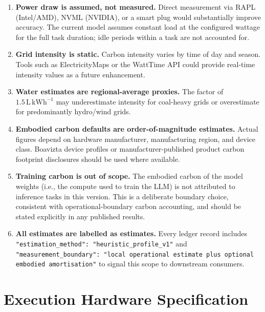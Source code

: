\documentclass[12pt]{article}
\begin{document}
\begin{enumerate}
  \item \textbf{Power draw is assumed, not measured.} Direct measurement via
    RAPL (Intel/AMD), NVML (NVIDIA), or a smart plug would substantially
    improve accuracy. The current model assumes constant load at the configured
    wattage for the full task duration; idle periods within a task are not
    accounted for.

  \item \textbf{Grid intensity is static.} Carbon intensity varies by time of
    day and season. Tools such as ElectricityMaps or the WattTime API could
    provide real-time intensity values as a future enhancement.

  \item \textbf{Water estimates are regional-average proxies.} The factor of
    $1.5\,\text{L}\,\text{kWh}^{-1}$ may underestimate intensity for coal-heavy
    grids or overestimate for predominantly hydro/wind grids.

  \item \textbf{Embodied carbon defaults are order-of-magnitude estimates.}
    Actual figures depend on hardware manufacturer, manufacturing region, and
    device class. Boavizta device profiles or manufacturer-published product
    carbon footprint disclosures should be used where available.

  \item \textbf{Training carbon is out of scope.} The embodied carbon of the
    model weights (i.e., the compute used to train the LLM) is not attributed
    to inference tasks in this version. This is a deliberate boundary choice,
    consistent with operational-boundary carbon accounting, and should be stated
    explicitly in any published results.

  \item \textbf{All estimates are labelled as estimates.} Every ledger record
    includes
    \texttt{"estimation\_method": "heuristic\_profile\_v1"} and
    \texttt{"measurement\_boundary": "local operational estimate plus optional
    embodied amortisation"} to signal this scope to downstream consumers.
\end{enumerate}

\section{Execution Hardware Specification}
\end{document}
